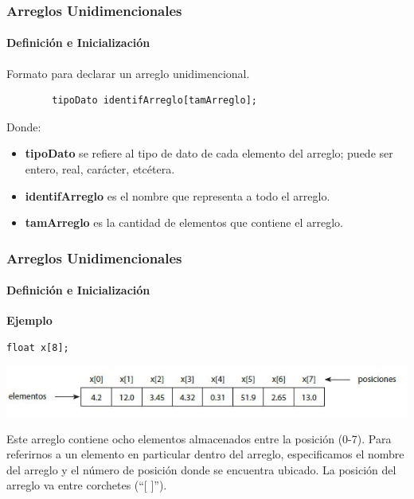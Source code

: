 \begin{frame}[fragile]
    \frametitle{Arreglos Unidimencionales}
    \framesubtitle{Definición e Inicialización}
    Formato para declarar un arreglo unidimencional.
    \vspace{2mm}
    \begin{lstlisting}
        tipoDato identifArreglo[tamArreglo];
\end{lstlisting}
Donde:
\begin{itemize}
    \item \textbf{tipoDato} se refiere al tipo de dato de cada elemento del arreglo; puede ser entero, real, carácter, etcétera. \pause
    \item \textbf{identifArreglo} es el nombre que representa a todo el arreglo.\pause
    \item \textbf{tamArreglo} es la cantidad de elementos que contiene el arreglo.\pause
\end{itemize}
\end{frame}


\begin{frame}[fragile, t]
    \frametitle{Arreglos Unidimencionales}
    \framesubtitle{Definición e Inicialización}
    \begin{center}\textbf{Ejemplo}\end{center}
        \vspace{-4mm}
    \begin{lstlisting}
float x[8];
    \end{lstlisting}
    \vspace{-5mm}
\begin{center}
        \includegraphics[scale=0.55]{figs/ejemploArregloUnidimencional}
\end{center}
\vspace{-6mm}
\justify
\hspace{5mm}Este arreglo contiene ocho elementos almacenados entre la posición (0-7). Para referirnos a un elemento en particular dentro del arreglo, especificamos el nombre del arreglo y el número de posición donde se encuentra ubicado. La posición del arreglo va entre corchetes (“[ ]”).
\end{frame}


